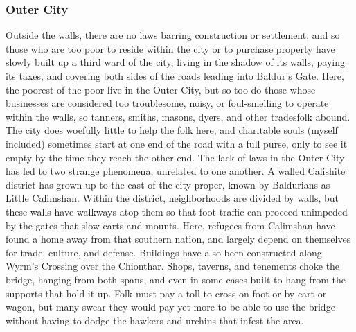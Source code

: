 \documentclass[10pt,a4paper,twoside,twocolumn,openany,bg=print,nodeprecatedcode]{dndbook}
\begin{document}
\subsubsection{Outer City}
Outside the walls, there are no laws barring construction or settlement, and so those who are too poor to reside within the city or to purchase property have slowly built up a third ward of the city, living in the shadow of its walls, paying its taxes, and covering both sides of the roads leading into Baldur's Gate. Here, the poorest of the poor live in the Outer City, but so too do those whose businesses are considered too troublesome, noisy, or foul-smelling to operate within the walls, so tanners, smiths, masons, dyers, and other tradesfolk abound. The city does woefully little to help the folk here, and charitable souls (myself included) sometimes start at one end of the road with a full purse, only to see it empty by the time they reach the other end.
The lack of laws in the Outer City has led to two strange phenomena, unrelated to one another. A walled Calishite district has grown up to the east of the city proper, known by Baldurians as Little Calimshan. Within the district, neighborhoods are divided by walls, but these walls have walkways atop them so that foot traffic can proceed unimpeded by the gates that slow carts and mounts. Here, refugees from Calimshan have found a home away from that southern nation, and largely depend on themselves for trade, culture, and defense.
Buildings have also been constructed along Wyrm's Crossing over the Chionthar. Shops, taverns, and tenements choke the bridge, hanging from both spans, and even in some cases built to hang from the supports that hold it up. Folk must pay a toll to cross on foot or by cart or wagon, but many swear they would pay yet more to be able to use the bridge without having to dodge the hawkers and urchins that infest the area.
\end{document}
